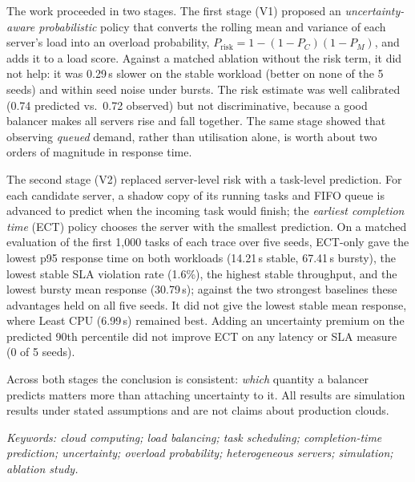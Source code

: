\documentclass[11pt,a4paper]{article}
\newcommand{\prisk}{P_{\mathrm{risk}}}
\begin{document}
The work proceeded in two stages. The first stage (V1) proposed an \emph{uncertainty-aware probabilistic}
policy that converts the rolling mean and variance of each server's load into an overload probability,
$\prisk = 1-(1-P_C)(1-P_M)$, and adds it to a load score. Against a matched ablation without the risk
term, it did not help: it was 0.29\,s slower on the stable workload (better on none of the 5 seeds) and
within seed noise under bursts. The risk estimate was well calibrated (0.74 predicted vs.\ 0.72 observed) but not
discriminative, because a good balancer makes all servers rise and fall together. The same stage showed
that observing \emph{queued} demand, rather than utilisation alone, is worth about two orders of magnitude
in response time.

The second stage (V2) replaced server-level risk with a task-level prediction. For each candidate server,
a shadow copy of its running tasks and FIFO queue is advanced to predict when the incoming task would
finish; the \emph{earliest completion time} (ECT) policy chooses the server with the smallest prediction.
On a matched evaluation of the first 1,000 tasks of each trace over five seeds, ECT-only gave the lowest
p95 response time on both workloads (14.21\,s stable, 67.41\,s bursty), the lowest stable SLA violation rate
(1.6\%), the highest stable throughput, and the lowest bursty mean response (30.79\,s); against the two
strongest baselines these advantages held on all five seeds. It did not give the lowest stable mean response,
where Least CPU (6.99\,s) remained best. Adding an uncertainty premium on the
predicted 90th percentile did not improve ECT on any latency or SLA measure (0 of 5 seeds).

Across both stages the conclusion is consistent: \emph{which} quantity a balancer predicts matters more than
attaching uncertainty to it. All results are simulation results under stated assumptions and are not
claims about production clouds.

\textit{Keywords: cloud computing; load balancing; task scheduling; completion-time prediction; uncertainty;
overload probability; heterogeneous servers; simulation; ablation study.}
\end{document}
